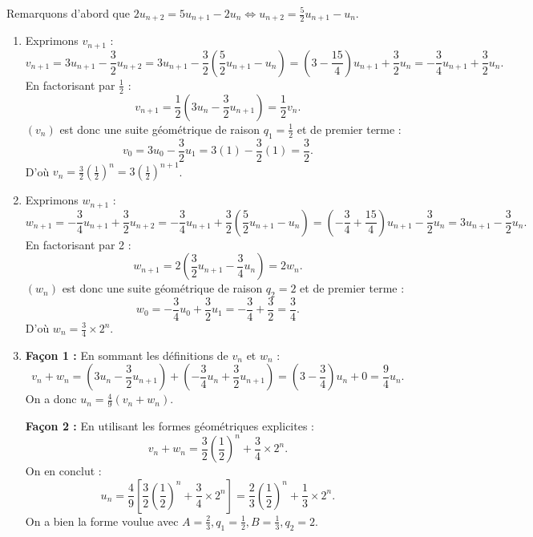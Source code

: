 \documentclass[11pt,a4paper]{article}
\begin{document}
\begin{correctionbox}
Remarquons d'abord que $2u_{n+2} = 5u_{n+1} - 2u_n \iff u_{n+2} = \frac{5}{2}u_{n+1} - u_n$.
\begin{enumerate}
    \item Exprimons $v_{n+1}$ :
    \[
    v_{n+1} = 3u_{n+1} - \frac{3}{2}u_{n+2} = 3u_{n+1} - \frac{3}{2}\left(\frac{5}{2}u_{n+1} - u_n\right) = \left(3 - \frac{15}{4}\right)u_{n+1} + \frac{3}{2}u_n = -\frac{3}{4}u_{n+1} + \frac{3}{2}u_n.
    \]
    En factorisant par $\frac{1}{2}$ :
    \[
    v_{n+1} = \frac{1}{2}\left(3u_n - \frac{3}{2}u_{n+1}\right) = \frac{1}{2}v_n.
    \]
    $(v_n)$ est donc une suite géométrique de raison $q_1 = \frac{1}{2}$ et de premier terme :
    \[
    v_0 = 3u_0 - \frac{3}{2}u_1 = 3(1) - \frac{3}{2}(1) = \frac{3}{2}.
    \]
    D'où $v_n = \frac{3}{2} \left(\frac{1}{2}\right)^n = 3 \left(\frac{1}{2}\right)^{n+1}$.
    \item Exprimons $w_{n+1}$ :
    \[
    w_{n+1} = -\frac{3}{4}u_{n+1} + \frac{3}{2}u_{n+2} = -\frac{3}{4}u_{n+1} + \frac{3}{2}\left(\frac{5}{2}u_{n+1} - u_n\right) = \left(-\frac{3}{4} + \frac{15}{4}\right)u_{n+1} - \frac{3}{2}u_n = 3u_{n+1} - \frac{3}{2}u_n.
    \]
    En factorisant par 2 :
    \[
    w_{n+1} = 2\left(\frac{3}{2}u_{n+1} - \frac{3}{4}u_n\right) = 2 w_n.
    \]
    $(w_n)$ est donc une suite géométrique de raison $q_2 = 2$ et de premier terme :
    \[
    w_0 = -\frac{3}{4}u_0 + \frac{3}{2}u_1 = -\frac{3}{4} + \frac{3}{2} = \frac{3}{4}.
    \]
    D'où $w_n = \frac{3}{4} \times 2^n$.
    \item
    \textbf{Façon 1 :} En sommant les définitions de $v_n$ et $w_n$ :
    \[
    v_n + w_n = \left(3u_n - \frac{3}{2}u_{n+1}\right) + \left(-\frac{3}{4}u_n + \frac{3}{2}u_{n+1}\right) = \left(3 - \frac{3}{4}\right)u_n + 0 = \frac{9}{4}u_n.
    \]
    On a donc $u_n = \frac{4}{9}(v_n + w_n)$.

    \textbf{Façon 2 :} En utilisant les formes géométriques explicites :
    \[
    v_n + w_n = \frac{3}{2}\left(\frac{1}{2}\right)^n + \frac{3}{4} \times 2^n.
    \]
    On en conclut :
    \[
    u_n = \frac{4}{9}\left[\frac{3}{2}\left(\frac{1}{2}\right)^n + \frac{3}{4} \times 2^n\right] = \frac{2}{3}\left(\frac{1}{2}\right)^n + \frac{1}{3} \times 2^n.
    \]
    On a bien la forme voulue avec $A = \frac{2}{3}, q_1 = \frac{1}{2}, B = \frac{1}{3}, q_2 = 2$.
\end{enumerate}
\end{correctionbox}

\end{document}

